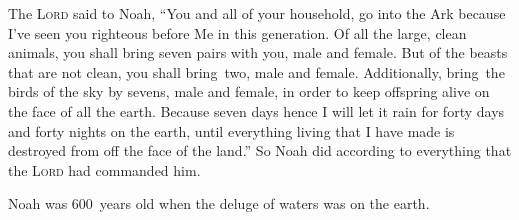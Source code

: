 
\begin{inparaenum}
     The \textsc{Lord} said to Noah, ``You and all of your household, go into the Ark because I've seen you righteous before Me in this generation.%
     Of all the large, clean animals, you shall bring seven pairs with you, male and female. But of the beasts that are not clean, you shall bring\understood\ two, male and female.%
     Additionally, bring\understood\ the birds of the sky by sevens, male and female, in order to keep offspring alive on the face of all the earth.%
     Because seven days hence I will let it rain for forty days and forty nights on the earth, until everything living that I have made is destroyed from off the face of the land.''%
     So Noah did according to everything that the \textsc{Lord} had commanded him.%
    
     Noah was 600~years old when the deluge of waters was on the earth.%
\end{inparaenum}
